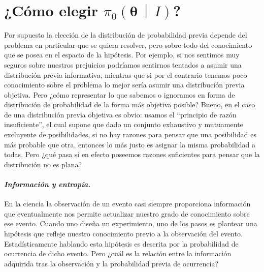 \documentclass[a4paper,twoside]{article}
\newcommand{\hip}{\ensuremath{\mathbold{\theta}}\xspace}
\newcommand{\pri}[2]{\ensuremath{\pi_0\left(#1\,\middle|\, #2\right)}\xspace}
\begin{document}

\section*{¿Cómo elegir \pri{\hip}{I}?}
%
Por supuesto la elección de la distribución de probabilidad previa depende del problema en
particular que se quiera resolver, pero sobre todo del conocimiento que se posea en el espacio de la
hipótesis. Por ejemplo, si nos sentimos muy seguros sobre nuestros prejuicios podríamos sentirnos
tentados a asumir una distribución previa informativa,
mientras que si por el contrario tenemos poco conocimiento sobre el problema lo mejor sería asumir
una distribución previa objetiva.
Pero ¿cómo representar lo que sabemos o ignoramos en forma de distribución de probabilidad de la
forma más objetiva posible? Bueno, en el caso de una distribución previa objetiva es obvio: usamos
el ``principio de razón insuficiente'', el cual supone que dado un conjunto exhaustivo y mutuamente
excluyente de posibilidades, si no hay razones para pensar que una posibilidad es más probable que
otra, entonces lo más justo es asignar la misma probabilidad a todas. Pero ¿qué pasa si en efecto
poseemos razones suficientes para pensar que la distribución no es plana?

\paragraph{\textit{\color{teal}Información y entropía.}} En la ciencia la observación de un evento
casi siempre proporciona información que eventualmente nos permite actualizar nuestro grado de
conocimiento sobre ese evento. Cuando uno diseña un experimiento, uno de los pasos es plantear una
hipótesis que refleje nuestro conocimiento previo a la observación del evento. Estadísticamente
hablando esta hipótesis es descrita por la probabilidad de ocurrencia de dicho evento. Pero ¿cuál es
la relación entre la información adquirida tras la observación y la probabilidad previa de
ocurrencia?
\end{document}

